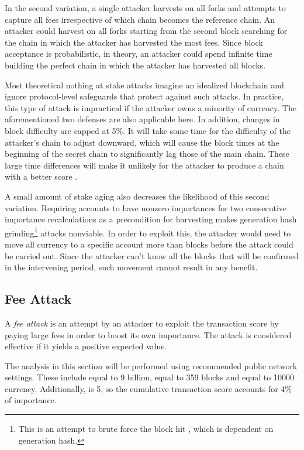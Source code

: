 In the second variation, a single attacker harvests on all forks and attempts to capture all fees irrespective of which chain becomes the reference chain.
An attacker could harvest on all forks starting from the second block searching for the chain in which the attacker has harvested the most fees.
Since block acceptance is probabilistic, in theory, an attacker could spend infinite time building the perfect chain in which the attacker has harvested all blocks.

Most theoretical nothing at stake attacks imagine an idealized blockchain and ignore protocol-level safeguards that protect against such attacks.
In practice, this type of attack is impractical if the attacker owns a minority of currency.
The aforementioned two defenses are also applicable here.
In addition, changes in block difficulty  are capped at 5\%.
It will take some time for the difficulty of the attacker's chain to adjust downward, which will cause the block times at the beginning of the secret chain to significantly lag those of the main chain.
These large time differences will make it unlikely for the attacker to produce a chain with a better score .

A small amount of stake aging also decreases the likelihood of this second variation.
Requiring accounts to have nonzero importances for two consecutive importance recalculations as a precondition for harvesting makes generation hash grinding\footnote{This is an attempt to brute force the block hit , which is dependent on generation hash.} attacks nonviable.
In order to exploit this, the attacker would need to move all currency to a specific account more than  blocks before the attack could be carried out.
Since the attacker can't know all the blocks that will be confirmed in the intervening period, such movement cannot result in any benefit.

\subsection{Fee Attack}
\label{sec:consensus:feeAttack}

A \emph{fee attack} is an attempt by an attacker to exploit the transaction score by paying large fees in order to boost its own importance.
The attack is considered effective if it yields a positive expected value.

The analysis in this section will be performed using recommended public network settings.
These include  equal to 9 billion,  equal to 359 blocks and  equal to 10000 currency.
Additionally,  is 5, so the cumulative transaction score accounts for 4\% of importance.

